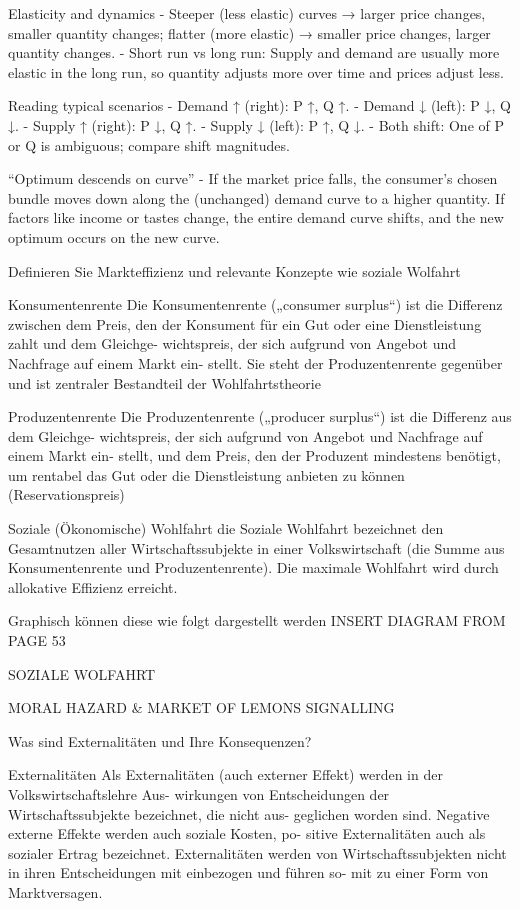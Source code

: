 Elasticity and dynamics
- Steeper (less elastic) curves → larger price changes, smaller quantity changes; flatter (more elastic) → smaller price changes, larger quantity changes.
- Short run vs long run: Supply and demand are usually more elastic in the long run, so quantity adjusts more over time and prices adjust less.

Reading typical scenarios
- Demand ↑ (right): P ↑, Q ↑.
- Demand ↓ (left): P ↓, Q ↓.
- Supply ↑ (right): P ↓, Q ↑.
- Supply ↓ (left): P ↑, Q ↓.
- Both shift: One of P or Q is ambiguous; compare shift magnitudes.

“Optimum descends on curve”
- If the market price falls, the consumer’s chosen bundle moves down along the (unchanged) demand curve to a higher quantity. 
If factors like income or tastes change, the entire demand curve shifts, and the new optimum occurs on the new curve.


Definieren Sie Markteffizienz und relevante Konzepte wie soziale Wolfahrt

Konsumentenrente
Die Konsumentenrente („consumer surplus“) ist die Differenz zwischen dem Preis,
den der Konsument für ein Gut oder eine Dienstleistung zahlt und dem Gleichge-
wichtspreis, der sich aufgrund von Angebot und Nachfrage auf einem Markt ein-
stellt. Sie steht der Produzentenrente gegenüber und ist zentraler Bestandteil der
Wohlfahrtstheorie

Produzentenrente
Die Produzentenrente („producer surplus“) ist die Differenz aus dem Gleichge-
wichtspreis, der sich aufgrund von Angebot und Nachfrage auf einem Markt ein-
stellt, und dem Preis, den der Produzent mindestens benötigt, um rentabel das
Gut oder die Dienstleistung anbieten zu können (Reservationspreis)

Soziale (Ökonomische) Wohlfahrt
die Soziale Wohlfahrt bezeichnet den Gesamtnutzen aller Wirtschaftssubjekte in einer
Volkswirtschaft (die Summe aus Konsumentenrente und Produzentenrente). Die
maximale Wohlfahrt wird durch allokative Effizienz erreicht.

Graphisch können diese wie folgt dargestellt werden
INSERT DIAGRAM FROM PAGE 53

SOZIALE WOLFAHRT

MORAL HAZARD & MARKET OF LEMONS
SIGNALLING


Was sind Externalitäten und Ihre Konsequenzen?

Externalitäten
Als Externalitäten (auch externer Effekt) werden in der Volkswirtschaftslehre Aus-
wirkungen von Entscheidungen der Wirtschaftssubjekte bezeichnet, die nicht aus-
geglichen worden sind. Negative externe Effekte werden auch soziale Kosten, po-
sitive Externalitäten auch als sozialer Ertrag bezeichnet. Externalitäten werden von
Wirtschaftssubjekten nicht in ihren Entscheidungen mit einbezogen und führen so-
mit zu einer Form von Marktversagen.

